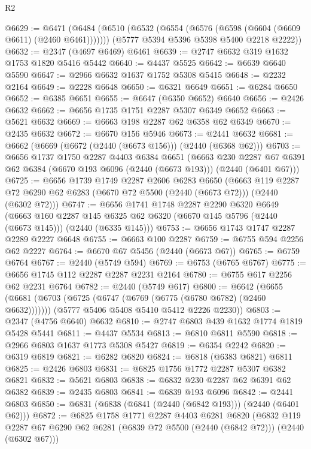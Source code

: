 \begin{lexlean}{R2}
\begin{coremodule}
@6629 := @6471
    (@6484
      (@6510 (@6532 (@6554 (@6576 (@6598 (@6604 (@6609 @6611) (@2460 @6461)))))))
      (@5777 @5394 @5396 @5398 @5400 @2218 @2222))
@6632 := @2347 (@4697 @6469) @6461
@6639 := @2747 @6632 @319 @1632 @1753 @1820 @5416 @5442
@6640 := @4437 @5525
@6642 := @6639 @6640 @5590
@6647 := @2966 @6632 @1637 @1752 @5308 @5415
@6648 := @2232 @2164
@6649 := @2228 @6648
@6650 := @6321 @6649
@6651 := @6284 @6650
@6652 := @6385 @6651
@6655 := @6647 (@6350 @6652) @6640
@6656 := @2426 @6632
@6662 := @6656 @1735 @1751 @2287 @5307 @6349 @6652
@6663 := @5621 @6632
@6669 := @6663 @198 @2287 @62 @6358 @62 @6349
@6670 := @2435 @6632
@6672 := @6670 @156 @5946
@6673 := @2441 @6632
@6681 := @6662 (@6669 (@6672 (@2440 (@6673 @156))) (@2440 (@6368 @62)))
@6703 := @6656
    @1737
    @1750
    @2287
    @4403
    @6384
    @6651
    (@6663
      @230
      @2287
      @67
      @6391
      @62
      @6384
      (@6670 @193 @6096 (@2440 (@6673 @193)))
      (@2440 (@6401 @67)))
@6725 := @6656
    @1739
    @1749
    @2287
    @2606
    @6283
    @6650
    (@6663 @119 @2287 @72 @6290 @62 @6283 (@6670 @72 @5500 (@2440 (@6673 @72))) (@2440 (@6302 @72)))
@6747 := @6656
    @1741
    @1748
    @2287
    @2290
    @6320
    @6649
    (@6663
      @160
      @2287
      @145
      @6325
      @62
      @6320
      (@6670 @145 @5796 (@2440 (@6673 @145)))
      (@2440 (@6335 @145)))
@6753 := @6656 @1743 @1747 @2287 @2289 @2227 @6648
@6755 := @6663 @100 @2287
@6759 := @6755 @594 @2256 @62 @2227
@6764 := @6670 @67 @5456 (@2440 (@6673 @67))
@6765 := @6759 @6764
@6767 := @2440 (@5749 @594)
@6769 := @6753 (@6765 @6767)
@6775 := @6656 @1745 @112 @2287 @2287 @2231 @2164
@6780 := @6755 @617 @2256 @62 @2231 @6764
@6782 := @2440 (@5749 @617)
@6800 := @6642
    (@6655
      (@6681 (@6703 (@6725 (@6747 (@6769 (@6775 (@6780 @6782) (@2460 @6632)))))))
      (@5777 @5406 @5408 @5410 @5412 @2226 @2230))
@6803 := @2347 (@4756 @6640) @6632
@6810 := @2747 @6803 @439 @1632 @1774 @1819 @5428 @5441
@6811 := @4437 @5534
@6813 := @6810 @6811 @5590
@6818 := @2966 @6803 @1637 @1773 @5308 @5427
@6819 := @6354 @2242
@6820 := @6319 @6819
@6821 := @6282 @6820
@6824 := @6818 (@6383 @6821) @6811
@6825 := @2426 @6803
@6831 := @6825 @1756 @1772 @2287 @5307 @6382 @6821
@6832 := @5621 @6803
@6838 := @6832 @230 @2287 @62 @6391 @62 @6382
@6839 := @2435 @6803
@6841 := @6839 @193 @6096
@6842 := @2441 @6803
@6850 := @6831 (@6838 (@6841 (@2440 (@6842 @193))) (@2440 (@6401 @62)))
@6872 := @6825
    @1758
    @1771
    @2287
    @4403
    @6281
    @6820
    (@6832 @119 @2287 @67 @6290 @62 @6281 (@6839 @72 @5500 (@2440 (@6842 @72))) (@2440 (@6302 @67)))

\end{coremodule}
\end{lexlean}
